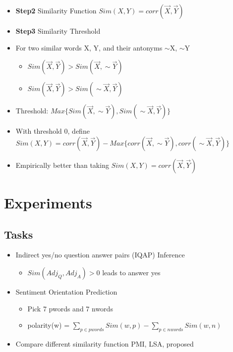 \documentclass[compress]{beamer}
\begin{document}
\begin{frame}[allowframebreaks]{\secname}
\framebreak

\begin{itemize}
\item \textbf{Step2} Similarity Function $Sim(X,Y)=corr(\vec{X}, \vec{Y})$
\item \textbf{Step3} Similarity Threshold
\item For two similar words X, Y, and their antonyms $\sim$X, $\sim$Y
\begin{itemize}
\item $Sim(\vec{X},\vec{Y})>Sim(\vec{X},\sim\vec{Y})$
\item $Sim(\vec{X},\vec{Y})>Sim(\sim\vec{X},\vec{Y})$
\end{itemize}
\item Threshold: $Max\{Sim(\vec{X},\sim\vec{Y}), Sim(\sim\vec{X},\vec{Y})\}$
\item With threshold $0$, define $Sim(X,Y) = corr(\vec{X},\vec{Y})-Max\{corr(\vec{X},\sim\vec{Y}), corr(\sim\vec{X},\vec{Y})\}$ 
\item Empirically better than taking $Sim(X,Y)=corr(\vec{X},\vec{Y})$
\end{itemize}
\end{frame}

\section{Experiments}
\subsection{Tasks}
\begin{frame}{\subsecname}
\begin{itemize}
\item  Indirect yes/no question answer pairs (IQAP) Inference
\begin{itemize}
\item $Sim(Adj_Q, Adj_A)>0$ leads to answer yes
\end{itemize}
\item  Sentiment Orientation Prediction 
\begin{itemize}
\item Pick 7 pwords and 7 nwords
\item polarity(w) = $\sum\limits_{p\in pwords}Sim(w,p)-\sum\limits_{p\in  nwords}Sim(w,n)$
\end{itemize}
\item Compare different similarity function PMI, LSA, proposed
\end{itemize}
\end{frame}
\end{document}
